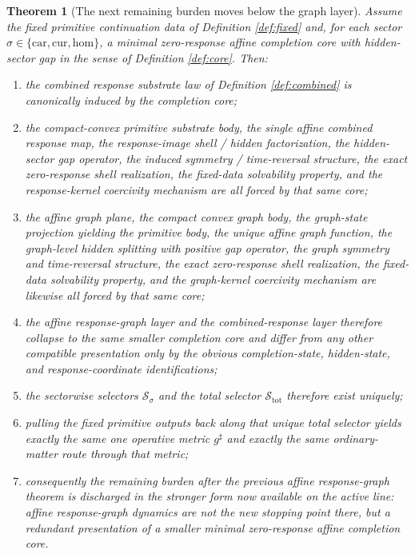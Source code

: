 \documentclass[11pt]{article}
\newcommand{\CompletedMetric}{g^{\sharp}}
\newcommand{\Car}{\mathrm{car}}
\newcommand{\Cur}{\mathrm{cur}}
\newcommand{\Hom}{\mathrm{hom}}
\newcommand{\ChainSelect}[1]{\mathcal S_{#1}}
\newcommand{\ChainSelectTriple}{\mathcal S_{\mathrm{tot}}}
\newtheorem{theorem}{Theorem}
\begin{document}
\begin{theorem}[The next remaining burden moves below the graph layer]
\label{thm:main}
Assume the fixed primitive continuation data of Definition \ref{def:fixed} and, for each sector \(\sigma\in\{\Car,\Cur,\Hom\}\), a minimal zero-response affine completion core with hidden-sector gap in the sense of Definition \ref{def:core}. Then:
\begin{enumerate}
    \item the combined response substrate law of Definition \ref{def:combined} is canonically induced by the completion core;
    \item the compact-convex primitive substrate body, the single affine combined response map, the response-image shell / hidden factorization, the hidden-sector gap operator, the induced symmetry / time-reversal structure, the exact zero-response shell realization, the fixed-data solvability property, and the response-kernel coercivity mechanism are all forced by that same core;
    \item the affine graph plane, the compact convex graph body, the graph-state projection yielding the primitive body, the unique affine graph function, the graph-level hidden splitting with positive gap operator, the graph symmetry and time-reversal structure, the exact zero-response shell realization, the fixed-data solvability property, and the graph-kernel coercivity mechanism are likewise all forced by that same core;
    \item the affine response-graph layer and the combined-response layer therefore collapse to the same smaller completion core and differ from any other compatible presentation only by the obvious completion-state, hidden-state, and response-coordinate identifications;
    \item the sectorwise selectors \(\ChainSelect{\sigma}\) and the total selector \(\ChainSelectTriple\) therefore exist uniquely;
    \item pulling the fixed primitive outputs back along that unique total selector yields exactly the same one operative metric \(\CompletedMetric\) and exactly the same ordinary-matter route through that metric;
    \item consequently the remaining burden after the previous affine response-graph theorem is discharged in the stronger form now available on the active line: affine response-graph dynamics are not the new stopping point there, but a redundant presentation of a smaller minimal zero-response affine completion core.
\end{enumerate}
\end{theorem}
\end{document}
